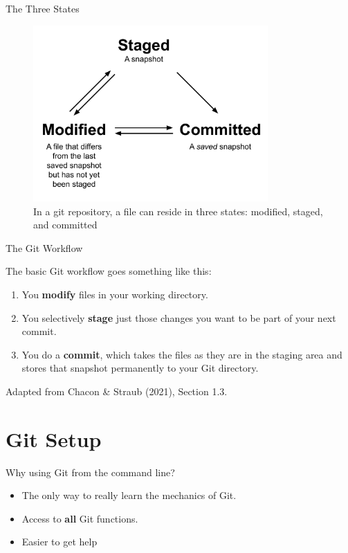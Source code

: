 \documentclass[handout]{beamer}
\begin{document}
\begin{frame}{The Three States}
  \begin{figure}
	  \includegraphics[width=0.8\textwidth]{figures/git_states.pdf}
	  \caption{In a git repository, a file can reside in three states: modified, staged, and committed}
  \end{figure} 
\end{frame}

\begin{frame}{The Git Workflow}
  \begin{exampleblock}{The basic Git workflow goes something like this:}
    \begin{enumerate}
      \item You \textbf{modify} files in your working directory.
      \item You selectively \textbf{stage} just those changes you want to be part of your next commit.
      \item You do a \textbf{commit}, which takes the files as they are in the staging area and stores that snapshot permanently to your Git directory.
    \end{enumerate}
  \end{exampleblock}
  {\scriptsize Adapted from Chacon \& Straub (2021), Section 1.3.}
\end{frame}

\section{Git Setup}

\begin{frame}{Why using Git from the command line?}
  \begin{itemize}
    \item The only way to really learn the mechanics of Git. 
    \item Access to \textbf{all} Git functions.
    \item Easier to get help
  \end{itemize}
\end{frame}
\end{document}
